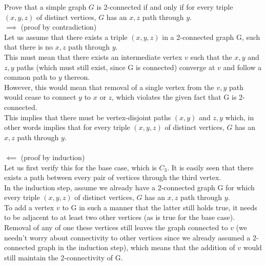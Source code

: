 \documentclass[12pt]{article}
\newenvironment{question}[2][Question]{\begin{trivlist}
\item[\hskip \labelsep {\bfseries #1}\hskip \labelsep {\bfseries #2.}]}{\end{trivlist}}
\begin{document}
\begin{question}{7}
Prove that a simple graph $G$ is 2-connected if and only if for every triple $(x, y, z)$ of distinct vertices, $G$ has an $x, z$ path through $y$. \\

\noindent
$\implies$ (proof by contradiction)\\
Let us assume that there exists a triple $(x, y, z)$ in a 2-connected graph G, such that there is no $x, z$ path through $y$.\\
This must mean that there exists an intermediate vertex $v$ such that the $x, y$ and $z, y$ paths (which must still exist, since G is connected) converge at $v$  and follow a common path to $y$ thereon.\\
However, this would mean that removal of a single vertex from the $v, y$ path would cease to connect $y$ to $x$ or $z$, which violates the given fact that G is 2-connected.\\
This implies that there must be vertex-disjoint paths $(x, y)$ and $z, y$ which, in other words implies that for every triple $(x, y, z)$ of distinct vertices, $G$ has an $x, z$ path through $y$.\\
\\
$\impliedby$ (proof by induction)\\
Let us first verify this for the base case, which is $C_3$. It is easily seen that there exists a path between every pair of vertices through the third vertex.\\
In the induction step, assume we already have a 2-connected graph G for which every triple $(x, y, z)$ of distinct vertices, $G$ has an $x, z$ path through $y$.\\
To add a vertex $v$ to G in such a manner that the latter still holds true, it needs to be adjacent to at least two other vertices (as is true for the base case).\\
Removal of any of one these vertices still leaves the graph connected to $v$ (we needn't worry about connectivity to other vertices since we already assumed a 2-connected graph in the induction step), which means that the addition of $v$ would still maintain the 2-connectivity of G. \\
\end{question}
\end{document}
